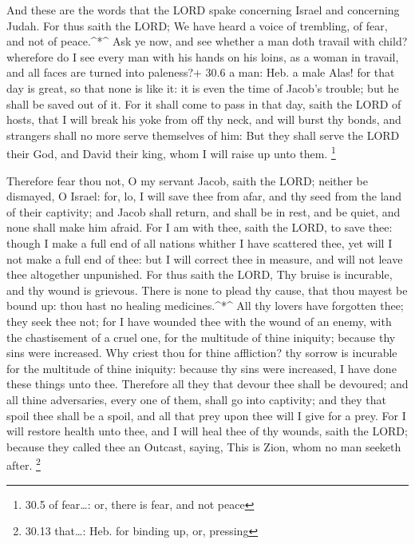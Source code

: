  And these are the words that the LORD spake concerning
Israel and concerning Judah.  For thus saith the LORD; We
have heard a voice of trembling, of fear, and not of peace.\^{}*\^{}
 Ask ye now, and see whether a man doth travail with child?
wherefore do I see every man with his hands on his loins, as a woman in
travail, and all faces are turned into paleness?+ 30.6 a man: Heb. a
male  Alas! for that day is great, so that none is like it:
it is even the time of Jacob's trouble; but he shall be saved out of it.
 For it shall come to pass in that day, saith the LORD of
hosts, that I will break his yoke from off thy neck, and will burst thy
bonds, and strangers shall no more serve themselves of him: 
But they shall serve the LORD their God, and David their king, whom I
will raise up unto them. \footnote{30.5 of fear\ldots: or, there is
  fear, and not peace}

 Therefore fear thou not, O my servant Jacob, saith the
LORD; neither be dismayed, O Israel: for, lo, I will save thee from
afar, and thy seed from the land of their captivity; and Jacob shall
return, and shall be in rest, and be quiet, and none shall make him
afraid.  For I am with thee, saith the LORD, to save thee:
though I make a full end of all nations whither I have scattered thee,
yet will I not make a full end of thee: but I will correct thee in
measure, and will not leave thee altogether unpunished. 
For thus saith the LORD, Thy bruise is incurable, and thy wound is
grievous.  There is none to plead thy cause, that thou
mayest be bound up: thou hast no healing medicines.\^{}*\^{}
 All thy lovers have forgotten thee; they seek thee not;
for I have wounded thee with the wound of an enemy, with the
chastisement of a cruel one, for the multitude of thine iniquity;
because thy sins were increased.  Why criest thou for thine
affliction? thy sorrow is incurable for the multitude of thine iniquity:
because thy sins were increased, I have done these things unto thee.
 Therefore all they that devour thee shall be devoured; and
all thine adversaries, every one of them, shall go into captivity; and
they that spoil thee shall be a spoil, and all that prey upon thee will
I give for a prey.  For I will restore health unto thee,
and I will heal thee of thy wounds, saith the LORD; because they called
thee an Outcast, saying, This is Zion, whom no man seeketh after.
\footnote{30.13 that\ldots: Heb. for binding up, or, pressing}


